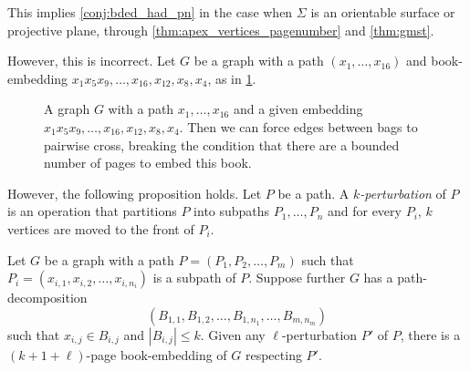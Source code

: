 This implies \cref{conj:bded_had_pn} in the case when $\Sigma$ is an orientable surface or projective plane, through \cref{thm:apex_vertices_pagenumber} and \cref{thm:gmst}. 

However, this is incorrect. Let $G$ be a graph with a path $(x_1, \ldots, x_{16})$ and book-embedding $x_1 x_5 x_9, \ldots, x_{16}, x_{12}, x_{8}, x_{4}$, as in \cref{fig:counterexample_2}.

\begin{figure}[h!]
	\centering
	
	\caption[Counterexample to bounded number of colours]{A graph $G$ with a path $x_1, \ldots, x_{16}$ and a given embedding $x_1 x_5 x_9, \ldots, x_{16}, x_{12}, x_{8}, x_{4}$. Then we can force edges between bags to pairwise cross, breaking the condition that there are a bounded number of pages to embed this book.}\label{fig:counterexample_2}
\end{figure}


However, the following proposition holds. Let $P$ be a path. A \textit{$k$-perturbation} of $P$ is an operation that partitions $P$ into subpaths $P_1, \ldots, P_n$ and for every $P_i$, $k$ vertices are moved to the front of $P_i$. 

\begin{proposition}
	Let $G$ be a graph with a path $P = (P_1, P_2, \ldots, P_m)$ such that $P_i = (x_{i,1}, x_{i,2}, \ldots, x_{i, n_{i}})$ is a subpath of $P$. Suppose further $G$ has a path-decomposition \[(B_{1,1}, B_{1,2}, \ldots, B_{1,n_{1}}, \ldots, B_{m, n_{m}})\] such that $x_{i,j} \in B_{i,j}$ and $|B_{i,j}| \leq k$. Given any $\ell$-perturbation $P'$ of $P$, there is a $(k + 1 + \ell)$-page book-embedding of $G$ respecting $P'$.
\end{proposition}

